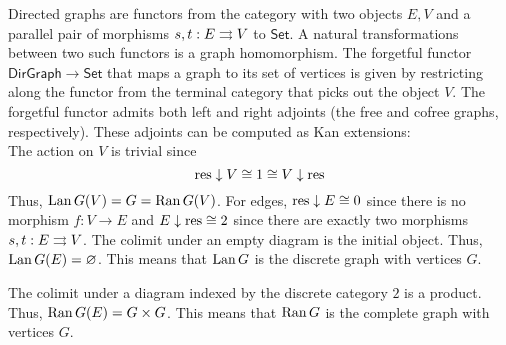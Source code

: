 \documentclass{amsart}
\begin{document}
\begin{eg}
  Directed graphs are functors from the category with two objects $E, V$ and a parallel pair of morphisms $s, t : E \rightrightarrows V$ to $\mathsf{Set}$.
  A natural transformations between two such functors is a graph homomorphism.
  The forgetful functor $\mathsf{DirGraph} \to \mathsf{Set}$ that maps a graph to its set of vertices is given by restricting along the functor from the terminal category that picks out the object $V$.
  The forgetful functor admits both left and right adjoints (the free and cofree graphs, respectively).
  These adjoints can be computed as Kan extensions:
  \[\]
  The action on $V$ is trivial since
  \[\mathrm{res} \downarrow V \cong 1 \cong V \downarrow \mathrm{res}\]
  Thus, $\operatorname{Lan} G(V) = G = \operatorname{Ran} G(V)$.
  For edges, $\mathrm{res} \downarrow E \cong 0$ since there is no morphism $f : V \to E$ and $E \downarrow \mathrm{res} \cong 2$ since there are exactly two morphisms $s, t : E \rightrightarrows V$.
  The colimit under an empty diagram is the initial object.
  Thus, $\operatorname{Lan} G(E) = \varnothing$.
  This means that $\operatorname{Lan} G$ is the discrete graph with vertices $G$.
  
  The colimit under a diagram indexed by the discrete category $2$ is a product.
  Thus, $\operatorname{Ran} G(E) = G \times G$.
  This means that $\operatorname{Ran} G$ is the complete graph with vertices $G$.
\end{eg}



\end{document}
